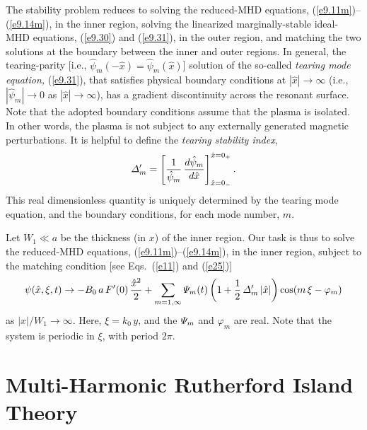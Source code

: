 \documentclass[12pt,prb,aps]{revtex4-1}
\begin{document}
The stability problem reduces to solving the  reduced-MHD equations, (\ref{e9.11m})--(\ref{e9.14m}), in the inner region, solving the linearized marginally-stable ideal-MHD
equations, (\ref{e9.30}) and (\ref{e9.31}), in the outer region, and matching the two solutions at the boundary between the
inner and outer regions.\cite{fkr} In general, the tearing-parity [i.e., $\hat{\psi}_m(-\hat{x})=\hat{\psi}_m(\hat{x})$] solution of the so-called {\em tearing mode equation,} (\ref{e9.31}), that satisfies
physical boundary conditions at $|\hat{x}|\rightarrow\infty$ (i.e., $|\hat{\psi}_m|\rightarrow 0$ as $|\hat{x}|\rightarrow \infty$), has a gradient discontinuity across the resonant surface.\cite{fkr} 
Note that the adopted boundary conditions assume that the plasma is isolated. In other words, the plasma is not subject to any externally generated magnetic perturbations. It is helpful to define the {\em tearing stability
index},\cite{fkr} 
\begin{equation}\label{e25}
{\mit\Delta}_m' =\left[\frac{1}{\hat{\psi}_m}\,\frac{d\hat{\psi}_m}{d\hat{x}}\right]_{\hat{x}=0_-}^{\hat{x}=0_+}.
\end{equation}
This real dimensionless quantity is uniquely determined by the tearing mode equation, and the boundary conditions,
for each mode number, $m$. 

Let $W_1\ll a$ be the thickness (in $x$) of the inner region. Our task is thus to solve the   reduced-MHD equations, (\ref{e9.11m})--(\ref{e9.14m}), in the inner region,  subject to the matching 
condition [see Eqs.~(\ref{e11}) and (\ref{e25})]
\begin{equation}\label{e26}
\psi(\hat{x},\xi,t) \rightarrow -B_0\,a\,F'(0)\,\frac{\hat{x}^2}{2} +\sum_{m=1,\infty}
{\mit\Psi}_m(t)\left(1+\frac{1}{2}\,{\mit\Delta}_m'\,|\hat{x}|\right)\cos(m\,\xi-\varphi_m)
\end{equation}
as $|x|/W_1\rightarrow\infty$. Here, $\xi=k_0\,y$, and the ${\mit\Psi}_m$ and $\varphi_m$ are real. Note that the
system is periodic in $\xi$, with period $2\pi$. 

\section{Multi-Harmonic Rutherford Island Theory}
\end{document}
